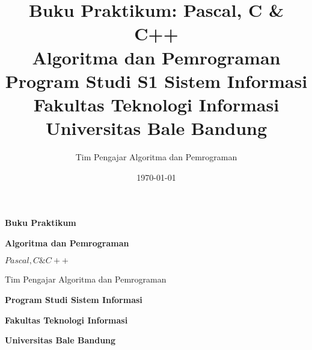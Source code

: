 \documentclass[12pt,a4paper,oneside]{book}
\title{Buku Praktikum: Pascal, C \& C++\\Algoritma dan Pemrograman\\Program Studi S1 Sistem Informasi\\Fakultas Teknologi Informasi\\Universitas Bale Bandung}
\author{Tim Pengajar Algoritma dan Pemrograman}
\date{\today}
\begin{document}
\frontmatter
\hypersetup{pageanchor=false}
\begin{titlepage}
  \centering
  \vspace*{2cm}
  
  {\huge\bfseries Buku Praktikum\par}
  \vspace{0.2cm}
  {\huge\bfseries Algoritma dan Pemrograman\par}
  \vspace{0.2cm}
  {\LARGE\bfseries \(Pascal, C \& C++\)\par}
  
  
  \vfill
  
  {\large Tim Pengajar Algoritma dan Pemrograman\par}
  
  \vfill
  
  {\large\bfseries Program Studi Sistem Informasi\par}
  \vspace{0.2cm}
  {\large\bfseries Fakultas Teknologi Informasi\par}
  \vspace{0.2cm}
  {\large\bfseries Universitas Bale Bandung\par}
  \vspace{0.2cm}
  {\large \the\year\par}
  
  \vspace{1cm}
\end{titlepage}
\hypersetup{pageanchor=true}
\tableofcontents

\cleardoublepage
\mainmatter

\backmatter
\printbibliography
\end{document}
